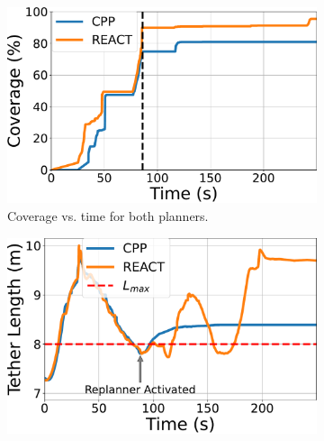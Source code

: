 \begin{table}[t]
    \centering
    \caption{Coverage Performance in Real-world Trials}
    \label{tab:realworld_coverage}
    \vspace{0.5em}
\end{table}



\begin{figure}[t]
    \centering
    \begin{subfigure}[b]{0.48\linewidth}
        \centering
        \includegraphics[width=\linewidth]{EA-Planner/figures/dfki_coverage_comparison_plot.pdf}
        \caption{ Coverage vs. time for both planners.}
        \label{fig:traj_noreact}
    \end{subfigure}
    \hfill
    \begin{subfigure}[b]{0.48\linewidth}
        \centering
        \includegraphics[width=\linewidth]{EA-Planner/figures/dfki_tether_length_vs_time.pdf}

\end{subfigure}
\end{figure}
